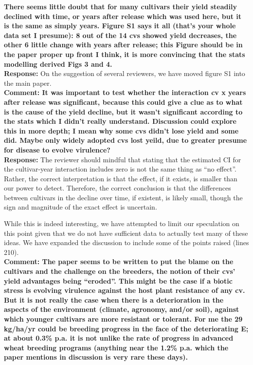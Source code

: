 \documentclass{article} \usepackage[margin=1in]{geometry}
\begin{document}
\textbf{There seems little doubt that for many cultivars their yield
  steadily declined with time, or years after release which was used
  here, but it is the same as simply years. Figure S1 says it all
  (that’s your whole data set I presume): 8 out of the 14 cvs showed
  yield decreases, the other 6 little change with years after release;
  this Figure should be in the paper proper up front I think, it is
  more convincing that the stats modelling derived Figs 3 and 4.}\\

\textbf{Response:} On the suggestion of several reviewers, we have
moved figure S1 into the main paper.\\

\textbf{Comment: It was important to test whether the interaction cv x
  years after release was significant, because this could give a clue
  as to what is the cause of the yield decline, but it wasn’t
  significant according to the stats which I didn’t really
  understand. Discussion could explore this in more depth; I mean why
  some cvs didn’t lose yield and some did. Maybe only widely adopted
  cvs lost yeild, due to greater presume for disease to evolve
  virulence?}\\

\textbf{Response:} The reviewer should mindful that stating that the
estimated CI for the cultivar-year interaction includes zero is not
the same thing as ``no effect''. Rather, the correct interpretation is
that the effect, if it exists, is smaller than our power to
detect. Therefore, the correct conclusion is that the differences
between cultivars in the decline over time, if existent, is likely
small, though the sign and magnitude of the exact effect is uncertain.

While this is indeed interesting, we have attempted to limit our
speculation on this point given that we do not have sufficient data to
actually test many of these ideas. We have expanded the discussion to
include some of the points raised (lines 210). \\

\textbf{Comment: The paper seems to be written to put the blame on the
  cultivars and the challenge on the breeders, the notion of their
  cvs’ yield advantages being “eroded”. This might be the case if a
  biotic stress is evolving virulence against the host plant
  resistance of any cv.  But it is not really the case when there is a
  deterioration in the aspects of the environment (climate, agronomy,
  and/or soil), against which younger cultivars are more resistant or
  tolerant.  For me the 29 kg/ha/yr could be breeding progress in the
  face of the deteriorating E; at about 0.3\% p.a. it is not unlike
  the rate of progress in advanced wheat breeding programs (anything
  near the 1.2\% p.a. which the paper mentions in discussion is very
  rare these days).}\\
\end{document}
